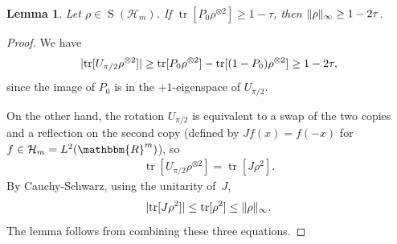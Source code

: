 \documentclass[11pt,a4paper]{article}
\newtheorem{lemma}[theorem]{Lemma}\AddToHook{env/lemma/begin}{\crefalias{theorem}{lemma}}
\numberwithin{equation}{section}
\newcommand{\ot}{\otimes}
\newcommand{\RR}{\mathbbm{R}}
\newcommand{\HH}{\mathcal{H}}
\newcommand{\1}{\mathbf{1}}
\renewcommand{\S}{\operatorname{S}}
\DeclareMathOperator{\tr}{tr}
\DeclarePairedDelimiter\abs{\lvert}{\rvert}
\DeclarePairedDelimiter\norm{\lVert}{\rVert}
\begin{document}
\begin{lemma}\label{lem:purity}
    Let $\rho \in \S(\HH_m)$.
    If $\tr[P_0 \rho^{\ot 2}] \geq 1 - \tau$, then $\norm{\rho}_{\infty} \geq 1 - 2\tau$.
\end{lemma}
\begin{proof}
    We have
    \begin{align*}
        \abs{\tr[U_{\pi/2} \rho^{\ot 2}]}
      \geq \tr[P_0\rho^{\ot 2}] - \tr[(1-P_0)\rho^{\ot 2}] \geq 1 - 2\tau,
    \end{align*}
    since the image of $P_0$ is in the $+1$-eigenspace of $U_{\pi/2}$.

    On the other hand, the rotation $U_{\pi/2}$ is equivalent to a swap of the two copies and a reflection on the second copy (defined by $J f(x) = f(-x)$ for $f \in \HH_m = L^2(\RR^m)$), so
    \begin{align*}
        \tr[U_{\pi/2} \rho^{\ot 2}] = \tr[J\rho^2].
    \end{align*}
    By Cauchy-Schwarz, using the unitarity of~$J$,
    \begin{align*}
        \abs{\tr[J\rho^2]} \leq \tr[\rho^2] \leq \norm{\rho}_{\infty}.
    \end{align*}
    The lemma follows from combining these three equations.
\end{proof}
\end{document}
